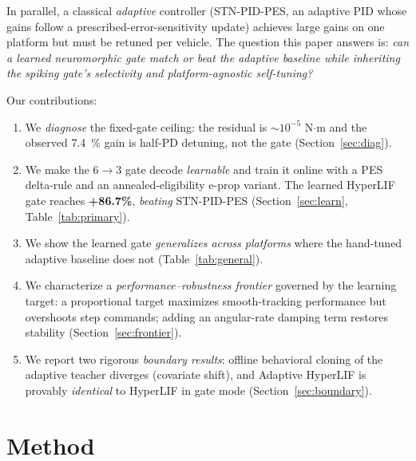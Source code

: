 \documentclass[conference]{IEEEtran}
\newcommand{\best}[1]{\textbf{#1}}
\begin{document}
In parallel, a classical \emph{adaptive} controller (STN-PID-PES, an adaptive PID
whose gains follow a prescribed-error-sensitivity update) achieves large gains on
one platform but must be retuned per vehicle. The question this paper answers is:
\emph{can a learned neuromorphic gate match or beat the adaptive baseline while
inheriting the spiking gate's selectivity and platform-agnostic self-tuning?}

Our contributions:
\begin{enumerate}
  \item We \emph{diagnose} the fixed-gate ceiling: the residual is $\sim\!10^{-5}$
        N$\cdot$m and the observed \SI{7.4}{\percent} gain is half-PD detuning,
        not the gate (Section~\ref{sec:diag}).
  \item We make the $6\!\rightarrow\!3$ gate decode \emph{learnable} and train it
        online with a PES delta-rule and an annealed-eligibility e-prop variant.
        The learned HyperLIF gate reaches \best{+86.7\%}, \emph{beating}
        STN-PID-PES (Section~\ref{sec:learn}, Table~\ref{tab:primary}).
  \item We show the learned gate \emph{generalizes across platforms} where the
        hand-tuned adaptive baseline does not (Table~\ref{tab:general}).
  \item We characterize a \emph{performance--robustness frontier} governed by the
        learning target: a proportional target maximizes smooth-tracking
        performance but overshoots step commands; adding an angular-rate damping
        term restores stability (Section~\ref{sec:frontier}).
  \item We report two rigorous \emph{boundary results}: offline behavioral cloning
        of the adaptive teacher diverges (covariate shift), and Adaptive HyperLIF
        is provably \emph{identical} to HyperLIF in gate mode
        (Section~\ref{sec:boundary}).
\end{enumerate}

\section{Method}\label{sec:method}
\end{document}
